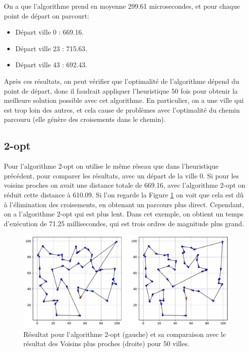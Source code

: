 \documentclass[a4paper,11pt,fleqn]{article}
\begin{document}
On a que l'algorithme prend en moyenne 299.61 microsecondes, et pour chaque point de départ on parcourt:
\begin{itemize}[noitemsep,topsep=5pt]
    \item Départ ville 0 : 669.16.
    \item Départ ville 23 : 715.63.
    \item Départ ville 43 : 692.43.
\end{itemize}

Après ces résultats, on peut vérifier que l'optimalité de l'algorithme dépend du point de départ, donc il faudrait appliquer l'heuristique 50 fois pour obtenir la meilleure solution possible avec cet algorithme. En particulier, on a une ville qui est trop loin des autres, et cela cause de problèmes avec l'optimalité du chemin parcouru (elle génère des croisements dans le chemin).

\subsection*{2-opt}
Pour l'algorithme 2-opt on utilise le même réseau que dans l'heuristique précédent, pour comparer les résultats, avec un départ de la ville 0. Si pour les voisins proches on avait une distance totale de 669.16, avec l'algorithme 2-opt on réduit cette distance à 610.09. Si l'on regarde la Figure \ref{fig:2opt-nn} on voit que cela est dû à l'élimination des croisements, en obtenant un parcours plus direct. Cependant, on a l'algorithme 2-opt qui est plus lent. Dans cet exemple, on obtient un temps d'exécution de 71.25 millisecondes, qui est trois ordres de magnitude plus grand.

\begin{figure}[H]
    \centering
    \includegraphics[width=\textwidth]{images/2opt_50_villes_nn.pdf}
    \caption{Résultat pour l'algorithme 2-opt (gauche) et sa comparaison avec le résultat des Voisins plus proches (droite) pour 50 villes.}
    \label{fig:2opt-nn}
\end{figure}
\end{document}
